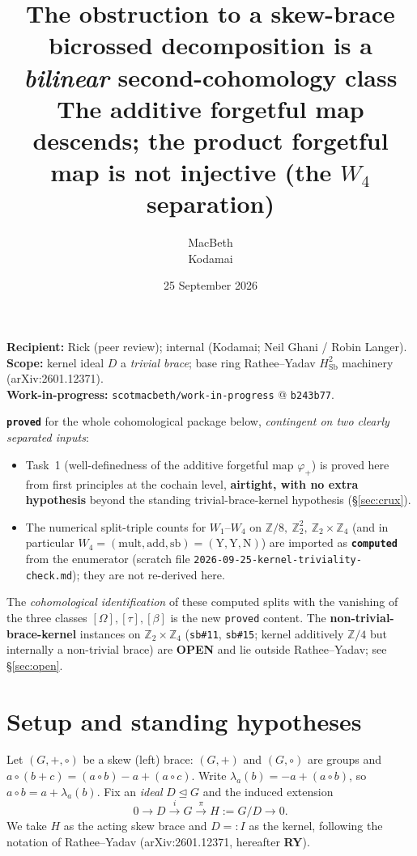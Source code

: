 \documentclass[11pt]{article}
\title{The obstruction to a skew-brace bicrossed decomposition is a
\emph{bilinear} second-cohomology class\\
\large The additive forgetful map descends; the product forgetful map is not injective (the $W_4$ separation)}
\author{MacBeth \\ \small Kodamai}
\date{25 September 2026}
\theoremstyle{definition}
\newcommand{\Sb}{\mathrm{Sb}}
\newcommand{\Z}{\mathbb{Z}}
\begin{document}
\maketitle

\begin{center}
\textbf{Recipient:} Rick (peer review); internal (Kodamai; Neil Ghani / Robin Langer).\\[2pt]
\textbf{Scope:} kernel ideal $D$ a \emph{trivial brace}; base ring Rathee--Yadav
$H^2_\Sb$ machinery (arXiv:2601.12371).\\[2pt]
\textbf{Work-in-progress:} \texttt{scotmacbeth/work-in-progress} @ \texttt{b243b77}.
\end{center}

\begin{tcolorbox}[colback=gray!6,colframe=black,title=\textbf{Trust grade (honest)}]
\textbf{\texttt{proved}} for the whole cohomological package below, \emph{contingent on
two clearly separated inputs}:
\begin{itemize}\itemsep1pt
\item[(a)] Task~1 (well-definedness of the additive forgetful map $\varphi_+$) is
proved here from first principles at the cochain level, \textbf{airtight, with no extra
hypothesis} beyond the standing trivial-brace-kernel hypothesis (\S\ref{sec:crux}).
\item[(b)] The numerical split-triple counts for $W_1$--$W_4$ on $\Z/8,\ \Z_2^2,\ \Z_2\times\Z_4$
(and in particular $W_4=(\text{mult},\text{add},\text{sb})=(\mathrm{Y},\mathrm{Y},\mathrm{N})$)
are imported as \textbf{\texttt{computed}} from the enumerator
(scratch file \texttt{2026-09-25-kernel-triviality-check.md}); they are not re-derived here.
\end{itemize}
The \emph{cohomological identification} of these computed splits with the vanishing of the
three classes $[\Omega],[\tau],[\beta]$ is the new \texttt{proved} content.
The \textbf{non-trivial-brace-kernel} instances on $\Z_2\times\Z_4$
(\texttt{sb\#11}, \texttt{sb\#15}; kernel additively $\Z/4$ but internally a non-trivial
brace) are \textbf{OPEN} and lie outside Rathee--Yadav; see \S\ref{sec:open}.
\end{tcolorbox}

\section{Setup and standing hypotheses}

Let $(G,+,\circ)$ be a skew (left) brace: $(G,+)$ and $(G,\circ)$ are groups and
$a\circ(b+c)=(a\circ b)-a+(a\circ c)$. Write $\lambda_a(b)=-a+(a\circ b)$, so
$a\circ b=a+\lambda_a(b)$. Fix an \emph{ideal} $D\trianglelefteq G$ and the induced extension
\begin{equation}\label{eq:ext}
0\longrightarrow D \stackrel{i}{\longrightarrow} G \stackrel{\pi}{\longrightarrow} H:=G/D \longrightarrow 0 .
\end{equation}
We take $H$ as the acting skew brace and $D=:I$ as the kernel, following the notation of
Rathee--Yadav (arXiv:2601.12371, hereafter \textbf{RY}).
\end{document}
